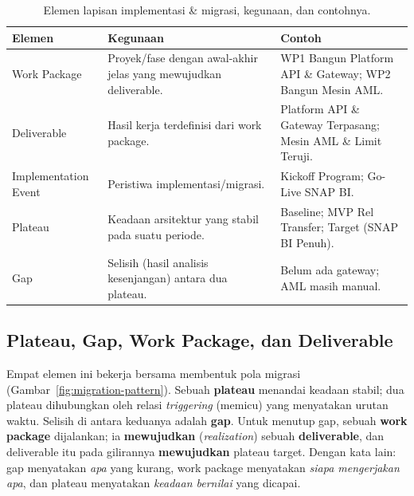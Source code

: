 \begin{table}[htbp]
\centering
\scriptsize
\caption{Elemen lapisan implementasi \& migrasi, kegunaan, dan contohnya.}
\label{tab:impl-elements}
\begin{tabularx}{\textwidth}{@{}p{} p{} X@{}}
\hline
\textbf{Elemen} & \textbf{Kegunaan} & \textbf{Contoh} \\
\hline
Work Package & Proyek/fase dengan awal-akhir jelas yang mewujudkan deliverable. &
WP1 Bangun Platform API \& Gateway; WP2 Bangun Mesin AML. \\
Deliverable & Hasil kerja terdefinisi dari work package. & Platform API \& Gateway
Terpasang; Mesin AML \& Limit Teruji. \\
Implementation Event & Peristiwa implementasi/migrasi. & Kickoff Program; Go-Live
SNAP BI. \\
Plateau & Keadaan arsitektur yang stabil pada suatu periode. & Baseline; MVP Rel
Transfer; Target (SNAP BI Penuh). \\
Gap & Selisih (hasil analisis kesenjangan) antara dua plateau. & Belum ada
gateway; AML masih manual. \\
\hline
\end{tabularx}
\end{table}

\subsection{Plateau, Gap, Work Package, dan Deliverable}

Empat elemen ini bekerja bersama membentuk pola migrasi
(Gambar~\ref{fig:migration-pattern}). Sebuah \textbf{plateau} menandai keadaan
stabil; dua plateau dihubungkan oleh relasi \emph{triggering} (memicu) yang
menyatakan urutan waktu. Selisih di antara keduanya adalah \textbf{gap}. Untuk
menutup gap, sebuah \textbf{work package} dijalankan; ia \textbf{mewujudkan}
(\emph{realization}) sebuah \textbf{deliverable}, dan deliverable itu pada
gilirannya \textbf{mewujudkan} plateau target. Dengan kata lain: gap menyatakan
\emph{apa} yang kurang, work package menyatakan \emph{siapa mengerjakan apa}, dan
plateau menyatakan \emph{keadaan bernilai} yang dicapai.


